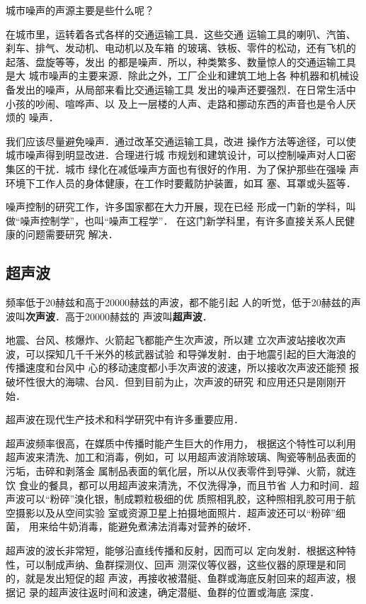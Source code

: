 城市噪声的声源主要是些什么呢？

在城市里，运转着各式各样的交通运输工具．这些交通
运输工具的喇叭、汽笛、刹车、排气、发动机、电动机以及车箱
的玻璃、铁板、零件的松动，还有飞机的起落、盘旋等等，发出
的都是噪声．所以，种类繁多、数量惊人的交通运输工具是大
城市噪声的主要来源．除此之外，工厂企业和建筑工地上各
种机器和机械设备发出的噪声，从局部来看比交通运输工具
发出的噪声还要强烈．在日常生活中小孩的吵闹、喧哗声、以
及上一层楼的人声、走路和挪动东西的声音也是令人厌烦的
噪声．

我们应该尽量避免噪声．通过改革交通运输工具，改进
操作方法等途径，可以使城市噪声得到明显改进．合理进行城
市规划和建筑设计，可以控制噪声对人口密集区的干扰．城市
绿化在减低噪声方面也有很好的作用．为了保护那些在强噪
声环境下工作人员的身体健康，在工作时要戴防护装置，如耳
塞、耳罩或头盔等．

噪声控制的研究工作，许多国家都在大力开展，现在已经
形成一门新的学科，叫做“噪声控制学”，也叫“噪声工程学”．
在这门新学科里，有许多直接关系人民健康的问题需要研究
解决．

\subsection{超声波}
频率低于20赫兹和高于20000赫兹的声波，都不能引起
人的听觉，低于20赫兹的声波叫\textbf{次声波}．高于20000赫兹的
声波叫\textbf{超声波}．

地震、台风、核爆炸、火箭起飞都能产生次声波，所以建
立次声波站接收次声波，可以探知几千千米外的核武器试验
和导弹发射．由于地震引起的巨大海浪的传播速度和台风中
心的移动速度都小手次声波的波速，所以接收次声波还能预
报破坏性很大的海啸、台风．但到目前为止，次声波的研究
和应用还只是刚刚开始．

超声波在现代生产技术和科学研究中有许多重要应用．

超声波频率很高，在媒质中传播时能产生巨大的作用力，
根据这个特性可以利用超声波来清洗、加工和消毒，例如，可
以用超声波消除玻璃、陶瓷等制品表面的污垢，击碎和剥落金
属制品表面的氧化层，所以从仪表零件到导弹、火箭，就连饮
食业的餐具，都可以用超声波来清洗，不仅洗得净，而且节省
人力和时间．超声波可以“粉碎”溴化银，制成颗粒极细的优
质照相乳胶，这种照相乳胶可用于航空摄影以及从空间实验
室或资源卫星上拍摄地面照片．超声波还可以“粉碎”细菌，
用来给牛奶消毒，能避免煮沸法消毒对营养的破坏．

超声波的波长非常短，能够沿直线传播和反射，因而可以
定向发射．根据这种特性，可以制成声纳、鱼群探测仪、回声
测深仪等仪器，这些仪器的原理是和同的，就是发出短促的超
声波，再接收被潜艇、鱼群或海底反射回来的超声波，根据记
录的超声波往返时间和波速，确定潜艇、鱼群的位置或海底
深度．

